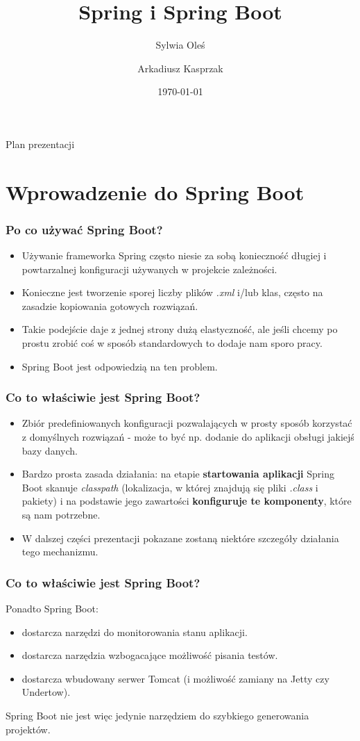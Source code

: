 \documentclass{beamer}
\title{Spring i Spring Boot}
\subtitle{}
\author{Sylwia Oleś \and Arkadiusz Kasprzak}
\institute{}
\date{\today}
\begin{document}
\titleframe[pl]

\begin{frame}{Plan prezentacji}
\tableofcontents
\end{frame}

\section{Wprowadzenie do Spring Boot}

\begin{frame}
\frametitle{Po co używać Spring Boot?}
\begin{itemize}
\item Używanie frameworka Spring często niesie za sobą konieczność długiej i powtarzalnej konfiguracji używanych w projekcie zależności.
\item Konieczne jest tworzenie sporej liczby plików \textit{.xml} i/lub klas, często na zasadzie kopiowania gotowych rozwiązań.
\item Takie podejście daje z jednej strony dużą elastyczność, ale jeśli chcemy po prostu zrobić coś w sposób standardowych to dodaje nam sporo pracy.
\item Spring Boot jest odpowiedzią na ten problem.
\end{itemize}
\end{frame}

\begin{frame}
\frametitle{Co to właściwie jest Spring Boot?}
\begin{itemize}
\item Zbiór predefiniowanych konfiguracji pozwalających w prosty sposób korzystać z domyślnych rozwiązań - może to być np. dodanie do aplikacji obsługi jakiejś bazy danych.
\item Bardzo prosta zasada działania: na etapie \textbf{startowania aplikacji} Spring Boot skanuje \textit{classpath} (lokalizacja, w której znajdują się pliki \textit{.class} i pakiety) i na podstawie jego zawartości \textbf{konfiguruje te komponenty}, które są nam potrzebne.
\item W dalszej części prezentacji pokazane zostaną niektóre szczegóły działania tego mechanizmu.
\end{itemize}
\end{frame}


\begin{frame}
\frametitle{Co to właściwie jest Spring Boot?}
Ponadto Spring Boot:
\begin{itemize}
\item dostarcza narzędzi do monitorowania stanu aplikacji.
\item dostarcza narzędzia wzbogacające możliwość pisania testów.
\item dostarcza wbudowany serwer Tomcat (i możliwość zamiany na Jetty czy Undertow).
\end{itemize}
Spring Boot nie jest więc jedynie narzędziem do szybkiego generowania projektów.
\end{frame}
\end{document}
